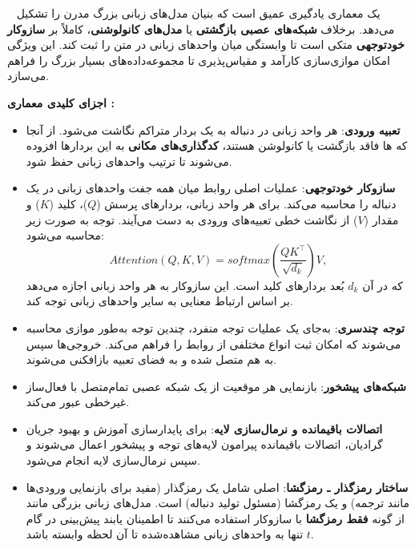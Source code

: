 \documentclass[12pt, a4paper]{report}
\begin{document}
~\cite{vaswani2017attention} یک معماری یادگیری عمیق است که بنیان مدل‌های زبانی بزرگ مدرن را تشکیل می‌دهد. برخلاف \textbf{شبکه‌های عصبی بازگشتی} یا \textbf{مدل‌های کانولوشنی}،  کاملاً بر \textbf{سازوکار خودتوجهی} متکی است تا وابستگی میان واحدهای زبانی در متن را ثبت کند. این ویژگی امکان موازی‌سازی کارآمد و مقیاس‌پذیری تا مجموعه‌داده‌های بسیار بزرگ را فراهم می‌سازد.

\bigskip
\textbf{اجزای کلیدی معماری :}

\begin{itemize}
    \item \textbf{تعبیه ورودی}: هر واحد زبانی در دنباله به یک بردار متراکم نگاشت می‌شود. از آنجا که ها فاقد بازگشت یا کانولوشن هستند، \textbf{کدگذاری‌های مکانی} به این بردارها افزوده می‌شوند تا ترتیب واحد‌های زبانی حفظ شود.
    
\item \textbf{سازوکار خودتوجهی}: عملیات اصلی روابط میان همه جفت واحدهای زبانی در یک دنباله را محاسبه می‌کند. برای هر واحد زبانی، بردارهای پرسش ($Q$)، کلید ($K$) و مقدار ($V$) از نگاشت خطی تعبیه‌های ورودی به دست می‌آیند. توجه به صورت زیر محاسبه می‌شود:
\[
Attention(Q,K,V) = softmax\left(\frac{QK^\top}{\sqrt{d_k}}\right)V,
\]
که در آن $d_k$ بُعد بردارهای کلید است. این سازوکار به هر واحد زبانی اجازه می‌دهد بر اساس ارتباط معنایی به سایر واحدهای زبانی توجه کند.

\item \textbf{توجه چندسری}: به‌جای یک عملیات توجه منفرد، چندین توجه به‌طور موازی محاسبه می‌شوند که امکان ثبت انواع مختلفی از روابط را فراهم می‌کند. خروجی‌ها سپس به هم متصل شده و به فضای تعبیه بازافکنی می‌شوند.

\item \textbf{شبکه‌های پیشخور}: بازنمایی هر موقعیت از یک شبکه عصبی تمام‌متصل با فعال‌ساز غیرخطی عبور می‌کند.

\item \textbf{اتصالات باقیمانده و نرمال‌سازی لایه}: برای پایدارسازی آموزش و بهبود جریان گرادیان، اتصالات باقیمانده پیرامون لایه‌های توجه و پیشخور اعمال می‌شوند و سپس نرمال‌سازی لایه انجام می‌شود.

\item \textbf{ساختار رمزگذار ـ رمزگشا}:  اصلی شامل یک رمزگذار (مفید برای بازنمایی ورودی‌ها مانند ترجمه) و یک رمزگشا (مسئول تولید دنباله) است. مدل‌های زبانی بزرگی مانند  از گونه \textbf{فقط رمزگشا} با سازوکار  استفاده می‌کنند تا اطمینان یابند پیش‌بینی در گام $t$ تنها به واحدهای زبانی مشاهده‌شده تا آن لحظه وابسته باشد.

\end{itemize}
\end{document}
